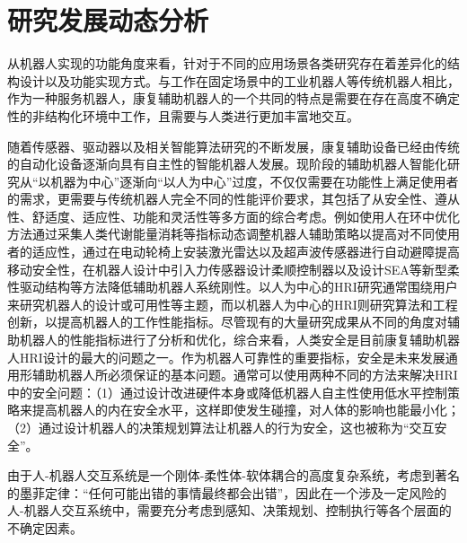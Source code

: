\section{研究发展动态分析}
从机器人实现的功能角度来看，针对于不同的应用场景各类研究存在着差异化的结构设计以及功能实现方式。与工作在固定场景中的工业机器人等传统机器人相比，作为一种服务机器人，康复辅助机器人的一个共同的特点是需要在存在高度不确定性的非结构化环境中工作，且需要与人类进行更加丰富地交互。

随着传感器、驱动器以及相关智能算法研究的不断发展，康复辅助设备已经由传统的自动化设备逐渐向具有自主性的智能机器人发展。现阶段的辅助机器人智能化研究从``以机器为中心''逐渐向``以人为中心''过度，不仅仅需要在功能性上满足使用者的需求，更需要与传统机器人完全不同的性能评价要求，其包括了从安全性、遵从性、舒适度、适应性、功能和灵活性等多方面的综合考虑\cite{heSurveyHumancenteredIntelligent2017b}。例如使用人在环中优化方法\cite{dingHumanintheloopOptimizationHip2018,zhangHumanintheloopOptimizationExoskeleton2017a,awadSoftRoboticExosuit2017}通过采集人类代谢能量消耗等指标动态调整机器人辅助策略以提高对不同使用者的适应性，通过在电动轮椅上安装激光雷达以及超声波传感器进行自动避障提高移动安全性\cite{fosterReflectanceFieldMap2023,parkDiscretetimeDynamicModeling2017,walterFrameworkLearningSemantic2014}，在机器人设计中引入力传感器设计柔顺控制器\cite{hong-guljunWalkingSittostandSupport2011,inhokimKinematicAnalysisSittostand2011}以及设计SEA等新型柔性驱动结构\cite{zhongGaitSymmetryEnhancement2022}等方法降低辅助机器人系统刚性。以人为中心的HRI研究通常围绕用户来研究机器人的设计或可用性等主题，而以机器人为中心的HRI则研究算法和工程创新，以提高机器人的工作性能指标。尽管现有的大量研究成果从不同的角度对辅助机器人的性能指标进行了分析和优化，综合来看，人类安全是目前康复辅助机器人HRI设计的最大的问题之一\cite{tadeleSafetyDomesticRobotics2014}。作为机器人可靠性的重要指标，安全是未来发展通用形辅助机器人所必须保证的基本问题。通常可以使用两种不同的方法来解决HRI中的安全问题：（1）通过设计改进硬件本身或降低机器人自主性使用低水平控制策略来提高机器人的内在安全水平，这样即使发生碰撞，对人体的影响也能最小化\cite{haddadinNewInsightsConcerning2010}；（2）通过设计机器人的决策规划算法让机器人的行为安全，这也被称为``交互安全''\cite{liuDesigningRobotBehavior}。

由于人-机器人交互系统是一个刚体-柔性体-软体耦合的高度复杂系统，考虑到著名的墨菲定律：``任何可能出错的事情最终都会出错''，因此在一个涉及一定风险的人-机器人交互系统中，需要充分考虑到感知、决策规划、控制执行等各个层面的不确定因素。


